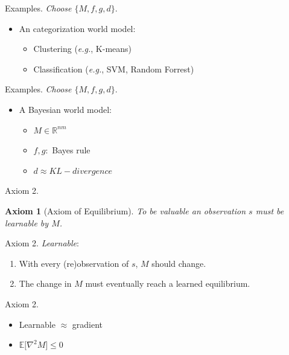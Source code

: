 \documentclass[10pt]{beamer}
\newtheorem{axiom}{Axiom}
\begin{document}
\begin{frame}[fragile]{Examples.}
\textit{Choose $\{M, f, g, d\}$}.
\begin{itemize}
    \item An categorization world model:
    \begin{itemize}
        \item Clustering (\textit{e.g.}, K-means)
        \item Classification (\textit{e.g.}, SVM, Random Forrest)
    \end{itemize}
\end{itemize}
\end{frame}

\begin{frame}[fragile]{Examples.}
\textit{Choose $\{M, f, g, d\}$}.
\begin{itemize}
    \item A Bayesian world model:
    \begin{itemize}
        \item $M \in \mathbb{R}^{nm}$
        \item $f,g: $ Bayes rule
        \item $d \approx KL-divergence$
    \end{itemize}
\end{itemize}
\end{frame}

\begin{frame}[fragile]{Axiom 2.}
\begin{axiom}
	[Axiom of Equilibrium] To be valuable an observation $s$ must be learnable by $M$. 
\label{ax:5} 
\end{axiom}
\end{frame}

\begin{frame}[fragile]{Axiom 2.}
\textit{Learnable}: 
\begin{enumerate}
    \item With every (re)observation of $s$, $M$ should change.
    \item The change in $M$ must eventually reach a learned equilibrium. 
\end{enumerate}
\end{frame}

\begin{frame}[fragile]{Axiom 2.}
\begin{itemize}
\item Learnable $\approx$ gradient
\item $\mathbb{E}\big [\nabla^2 M \big ] \leq 0$
\end{itemize}
\end{frame}
\end{document}
